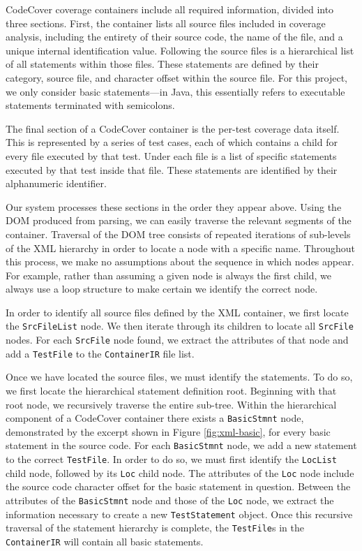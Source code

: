 CodeCover coverage containers include all required
information, divided into three sections.  First, the container lists all source
files included in coverage analysis, including the entirety of their source code,
the name of the file, and a unique internal identification value.  Following the source files
is a hierarchical list of all statements within those files.  These statements are defined by 
their category, source file, and character offset within the source file.  For this
project, we only consider basic statements---in Java, this essentially refers to executable
statements terminated with semicolons.  

The final section of a CodeCover container is the per-test coverage data itself.  This is
represented by a series of test cases, each of which contains a child for every file
executed by that test. Under each file is a list of specific statements executed by that
test inside that file.  These statements are identified by their alphanumeric identifier.

Our system processes these sections in the order they appear above.  Using the DOM produced
from parsing, we can easily traverse the relevant segments of the container.  Traversal of
the DOM tree consists of repeated iterations of sub-levels of the XML hierarchy in order
to locate a node with a specific name.  Throughout this process, we make no assumptions about
the sequence in which nodes appear.  For example, rather than assuming a given node is
always the first child, we always use a loop structure to make certain we identify the correct
node.

In order to identify all source files defined by the
XML container, we first locate the \texttt{SrcFileList} node.  We then iterate through its
children to locate all \texttt{SrcFile} nodes.  For each \texttt{SrcFile} node found, we 
extract the attributes of that node and add a \texttt{TestFile} to the \texttt{ContainerIR}
file list.  

Once we have located the source files, we must identify the statements.  To do so, we first
locate the hierarchical statement definition root.  Beginning with that root node, we recursively
traverse the entire sub-tree.  Within the hierarchical component of a CodeCover container there
exists a \texttt{BasicStmnt} node, demonstrated by the excerpt shown in Figure \ref{fig:xml-basic}, for every basic statement in the source code.  For each \texttt{BasicStmnt} node, we add a new statement to the 
correct \texttt{TestFile}.  In order to do so, we must first identify the \texttt{LocList} child
node, followed by its \texttt{Loc} child node.  The attributes of the \texttt{Loc} node include
the source code character offset for the basic statement in question.  Between the attributes of
the \texttt{BasicStmnt} node and those of the \texttt{Loc} node, we extract the information
necessary to create a new \texttt{TestStatement} object.  Once this recursive traversal of the
statement hierarchy is complete, the \texttt{TestFile}s in the \texttt{ContainerIR} will contain
all basic statements.

